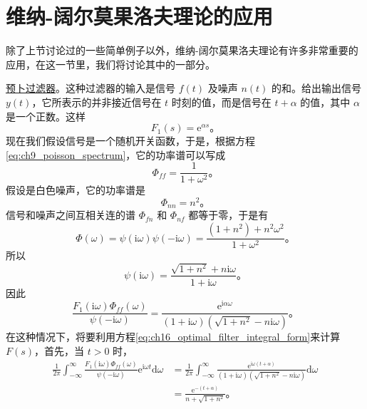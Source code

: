 \section{维纳-阔尔莫果洛夫理论的应用}

除了上节讨论过的一些简单例子以外，维纳-阔尔莫果洛夫理论有许多非常重要的应用，在这一节里，我们将讨论其中的一部分。

\underline{预卜过滤器}。这种过滤器的输入是信号 $f(t)$ 及噪声 $n(t)$ 的和。给出输出信号 $y(t)$，它所表示的并非接近信号在 $t$ 时刻的值，而是信号在 $t+\alpha$ 的值，其中 $\alpha$ 是一个正数。这样
\begin{equation}
F_1(s) = \mathrm{e}^{\alpha s}。
\label{eq:ch16_5_predictive_desired_tf}
\end{equation}
现在我们假设信号是一个随机开关函数，于是，根据方程\eqref{eq:ch9_poisson_spectrum}，它的功率谱可以写成
\begin{equation}
\Phi_{ff} = \frac{1}{1+\omega^2}。
\label{eq:ch16_5_predictive_signal_psd}
\end{equation}
假设是白色噪声，它的功率谱是
\begin{equation}
\Phi_{nn} = n^2。
\label{eq:ch16_5_predictive_noise_psd}
\end{equation}
信号和噪声之间互相关连的谱 $\Phi_{fn}$ 和 $\Phi_{nf}$ 都等于零，于是有
\begin{equation*}
\Phi(\omega) = \psi(\mathrm{i}\omega)\psi(-\mathrm{i}\omega) = \frac{(1+n^2)+n^2\omega^2}{1+\omega^2}。
\end{equation*}
所以
\begin{equation*}
\psi(\mathrm{i}\omega) = \frac{\sqrt{1+n^2}+n\mathrm{i}\omega}{1+\mathrm{i}\omega}。
\end{equation*}
因此
\begin{equation*}
\frac{F_1(\mathrm{i}\omega)\Phi_{ff}(\omega)}{\psi(-\mathrm{i}\omega)} = \frac{\mathrm{e}^{\mathrm{i}\alpha\omega}}{(1+\mathrm{i}\omega)(\sqrt{1+n^2}-n\mathrm{i}\omega)}。
\end{equation*}
在这种情况下，将要利用方程\eqref{eq:ch16_optimal_filter_integral_form}来计算 $F(s)$，首先，当 $t>0$ 时，
\begin{equation*}
\begin{aligned}
\frac{1}{2\pi}\int_{-\infty}^{\infty} \frac{F_1(\mathrm{i}\omega)\Phi_{ff}(\omega)}{\psi(-\mathrm{i}\omega)} \mathrm{e}^{\mathrm{i}\omega t} \mathrm{d}\omega &= \frac{1}{2\pi}\int_{-\infty}^{\infty} \frac{\mathrm{e}^{\mathrm{i}\omega(t+\alpha)}}{(1+\mathrm{i}\omega)(\sqrt{1+n^2}-n\mathrm{i}\omega)} \mathrm{d}\omega \\
&= \frac{\mathrm{e}^{-(t+\alpha)}}{n+\sqrt{1+n^2}}。
\end{aligned}
\end{equation*}
